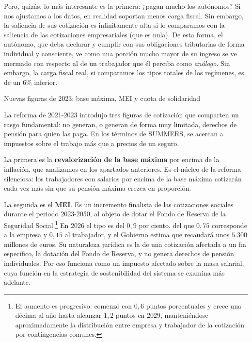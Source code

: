 \documentclass[10pt,a4paper]{article}
\begin{document}
Pero, quizás, lo más interesante es la primera: ¿pagan mucho los autónomos? Si nos ajustamos a los datos, en realidad soportan menos carga fiscal. Sin embargo, la saliencia de sus cotización es infinitamente alta si lo comparamos con la saliencia de las cotizaciones empresariales (que es nula). De esta forma, el autónomo, que deba declarar y cumplir con sus obligaciones tributarias de forma individual y consciente, ve como una porción mucho mayor de su ingreso se ve mermado con respecto al de un trabajador que él perciba como \textit{análogo}. Sin embargo, la carga fiscal real, si comparamos los tipos totales de los regímenes, es de un $6\%$ inferior.

Nuevas figuras de 2023: base máxima, MEI y cuota de solidaridad

La reforma de 2021-2023 introdujo tres figuras de cotización que comparten un rasgo fundamental: no generan, o generan de forma muy limitada, derechos de pensión para quien las paga. En los términos de SUMMERS, se acercan a impuestos sobre el trabajo más que a precios de un seguro.

La primera es la \textbf{revalorización de la base máxima} por encima de la inflación, que analizamos en los apartados anteriores. Es el núcleo de la reforma silenciosa: los trabajadores con salarios por encima de la base máxima cotizarán cada vez más sin que su pensión máxima crezca en proporción.

La segunda es el \textbf{MEI}. Es un incremento finalista de las cotizaciones sociales durante el periodo 2023-2050, al objeto de dotar el Fondo de Reserva de la Seguridad Social.\footnote{El aumento es progresivo: comenzó con $0,6$ puntos porcentuales y crece una décima al año hasta alcanzar $1,2$ puntos en 2029, manteniéndose aproximadamente la distribución entre empresa y trabajador de la cotización por contingencias comunes.
} En 2026 el tipo es del $0,9$ por ciento, del que $0,75$ corresponde a la empresa y $0,15$ al trabajador, y el Gobierno estima que recaudará unos $5.300$ millones de euros. Su naturaleza jurídica es la de una cotización afectada a un fin específico, la dotación del Fondo de Reserva, y no genera derechos de pensión individuales. Por eso funciona como un impuesto afectado sobre la masa salarial, cuya función en la estrategia de sostenibilidad del sistema se examina más adelante.
\end{document}
